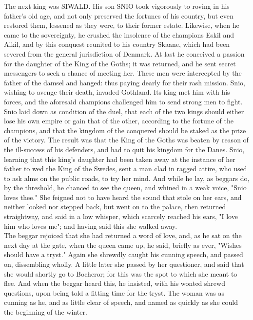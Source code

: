 \documentclass[10pt,a4paper]{report}
\begin{document}
The next king was SIWALD. His son SNIO took vigorously to roving in his father's old age, and not only preserved the fortunes of his country, but even restored them, lessened as they were, to their former estate. Likewise, when he came to the sovereignty, he crushed the insolence of the champions Eskil and Alkil, and by this conquest reunited to his country Skaane, which had been severed from the general jurisdiction of Denmark. At last he conceived a passion for the daughter of the King of the Goths; it was returned, and he sent secret messengers to seek a chance of meeting her. These men were intercepted by the father of the damsel and hanged: thus paying dearly for their rash mission. Snio, wishing to avenge their death, invaded Gothland. Its king met him with his forces, and the aforesaid champions challenged him to send strong men to fight. Snio laid down as condition of the duel, that each of the two kings should either lose his own empire or gain that of the other, according to the fortune of the champions, and that the kingdom of the conquered should be staked as the prize of the victory. The result was that the King of the Goths was beaten by reason of the ill-success of his defenders, and had to quit his kingdom for the Danes. Snio, learning that this king's daughter had been taken away at the instance of her father to wed the King of the Swedes, sent a man clad in ragged attire, who used to ask alms on the public roads, to try her mind. And while he lay, as beggars do, by the threshold, he chanced to see the queen, and whined in a weak voice, "Snio loves thee." She feigned not to have heard the sound that stole on her ears, and neither looked nor stepped back, but went on to the palace, then returned straightway, and said in a low whisper, which scarcely reached his ears, "I love him who loves me"; and having said this she walked away.\\

The beggar rejoiced that she had returned a word of love, and, as he sat on the next day at the gate, when the queen came up, he said, briefly as ever, "Wishes should have a tryst." Again she shrewdly caught his cunning speech, and passed on, dissembling wholly. A little later she passed by her questioner, and said that she would shortly go to Bocheror; for this was the spot to which she meant to flee. And when the beggar heard this, he insisted, with his wonted shrewd questions, upon being told a fitting time for the tryst. The woman was as cunning as he, and as little clear of speech, and named as quickly as she could the beginning of the winter.\\
\end{document}

